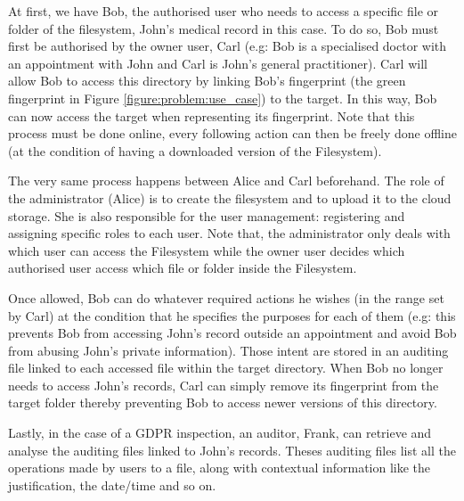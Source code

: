 \documentclass[../main.tex]{subfiles}
\begin{document}
\par At first, we have Bob, the authorised user who needs to access a specific file or folder of the filesystem, John's medical record in this case. To do so, Bob must first be authorised by the owner user, Carl (e.g: Bob is a specialised doctor with an appointment with John and Carl is John's general practitioner). Carl will allow Bob to access this directory by linking Bob's fingerprint (the green fingerprint in Figure \ref{figure:problem:use_case}) to the target. In this way, Bob can now access the target when representing its fingerprint. Note that this process must be done online, every following action can then be freely done offline (at the condition of having a downloaded version of the Filesystem).
\par The very same process happens between Alice and Carl beforehand. The role of the administrator (Alice) is to create the filesystem and to upload it to the cloud storage. She is also responsible for the user management: registering and assigning specific roles to each user. Note that, the administrator only deals with which user can access the Filesystem while the owner user decides which authorised user access which file or folder inside the Filesystem.
\par Once allowed, Bob can do whatever required actions he wishes (in the range set by Carl) at the condition that he specifies the purposes for each of them (e.g: this prevents Bob from accessing John's record outside an appointment and avoid Bob from abusing John's private information). Those intent are stored in an auditing file linked to each accessed file within the target directory. When Bob no longer needs to access John's records, Carl can simply remove its fingerprint from the target folder thereby preventing Bob to access newer versions of this directory.
\par Lastly, in the case of a GDPR inspection, an auditor, Frank, can retrieve and analyse the auditing files linked to John's records. Theses auditing files list all the operations made by users to a file, along with contextual information like the justification, the date/time and so on.
\end{document}
